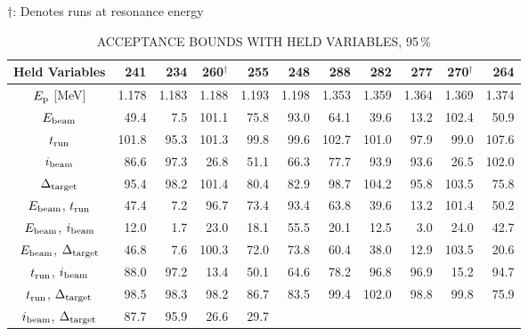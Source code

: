 \begin{landscape}
\begin{table}
\begin{center}
        \vspace{0.5em}
        $\dagger$: Denotes runs at resonance energy
    \end{center}
\end{table}
\end{landscape}

\begin{landscape}
\begin{table}
    \begin{center}
        \caption{ACCEPTANCE BOUNDS WITH HELD VARIABLES, 95\,\%}
        \label{tab:acceptance-uncertainty-95}
        \begin{tabular}{crrrrrrrrrr}
            \toprule
            \midrule
            \textbf{Held Variables}
                & \textbf{241} & \textbf{234} & \textbf{260}$^\dagger$ & \textbf{255} & \textbf{248}
                & \textbf{288} & \textbf{282} & \textbf{277} & \textbf{270}$^\dagger$ & \textbf{264} \\
            \midrule
$E_{\rm p}$ [MeV] & 1.178 & 1.183 & 1.188 & 1.193 & 1.198 & 1.353 & 1.359 & 1.364 & 1.369 & 1.374 \\
\midrule
$E_{\rm beam}$ &  49.4 &   7.5 & 101.1 &  75.8 &  93.0 &  64.1 &  39.6 &
    13.2 & 102.4 &  50.9 \\
$t_{\rm run}$ & 101.8 &  95.3 & 101.3 &  99.8 &  99.6 & 102.7 & 101.0 &
    97.9 &  99.0 & 107.6 \\
$i_{\rm beam}$ &  86.6 &  97.3 &  26.8 &  51.1 &  66.3 &  77.7 &  93.9 &
    93.6 &  26.5 & 102.0 \\
$\Delta_{\rm target}$ &  95.4 &  98.2 & 101.4 &  80.4 &  82.9 &  98.7 &
    104.2 &  95.8 & 103.5 &  75.8 \\
$E_{\rm beam}$, $t_{\rm run}$ &  47.4 &   7.2 &  96.7 &  73.4 &  93.4 &
    63.8 &  39.6 &  13.2 & 101.4 &  50.2 \\
$E_{\rm beam}$, $i_{\rm beam}$ &  12.0 &   1.7 &  23.0 &  18.1 &  55.5 &
    20.1 &  12.5 &   3.0 &  24.0 &  42.7 \\
$E_{\rm beam}$, $\Delta_{\rm target}$ &  46.8 &   7.6 & 100.3 &  72.0 &
    73.8 &  60.4 &  38.0 &  12.9 & 103.5 &  20.6 \\
$t_{\rm run}$, $i_{\rm beam}$ &  88.0 &  97.2 &  13.4 &  50.1 &  64.6 &
    78.2 &  96.8 &  96.9 &  15.2 &  94.7 \\
$t_{\rm run}$, $\Delta_{\rm target}$ &  98.5 &  98.3 &  98.2 &  86.7 &
    83.5 &  99.4 & 102.0 &  98.8 &  99.8 &  75.9 \\
$i_{\rm beam}$, $\Delta_{\rm target}$ &  87.7 &  95.9 &  26.6 &  29.7 &

\end{tabular}
\end{center}
\end{table}
\end{landscape}
